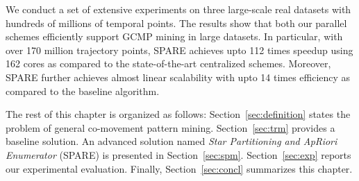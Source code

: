 We conduct a set of extensive experiments on three large-scale real datasets with hundreds of millions of
temporal points. 
The results show that both our parallel schemes efficiently support GCMP mining in large datasets.
In particular, with over 170 million trajectory points,
SPARE achieves upto 112 times speedup using 162 cores as compared to the state-of-the-art centralized schemes.
Moreover, SPARE further achieves almost linear scalability with upto 14 times efficiency
as compared to the baseline algorithm.


The rest of this chapter is organized as follows: %
Section~\ref{sec:definition} states the problem of general co-movement pattern mining. Section~\ref{sec:trm} provides a baseline 
solution. %
An advanced solution named
\emph{Star Partitioning and ApRiori Enumerator} (SPARE) is presented in Section~\ref{sec:spm}. Section~\ref{sec:exp} reports our experimental evaluation.
Finally, Section~\ref{sec:concl} summarizes this chapter.